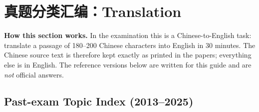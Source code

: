 \section{真题分类汇编：Translation}

\noindent\textbf{How this section works.}\quad
In the examination this is a Chinese-to-English task: translate a passage of 180--200 Chinese characters into English in 30 minutes. The Chinese source text is therefore kept exactly as printed in the papers; everything else is in English. The reference versions below are written for this guide and are \emph{not} official answers.

\subsection{Past-exam Topic Index (2013--2025)}

